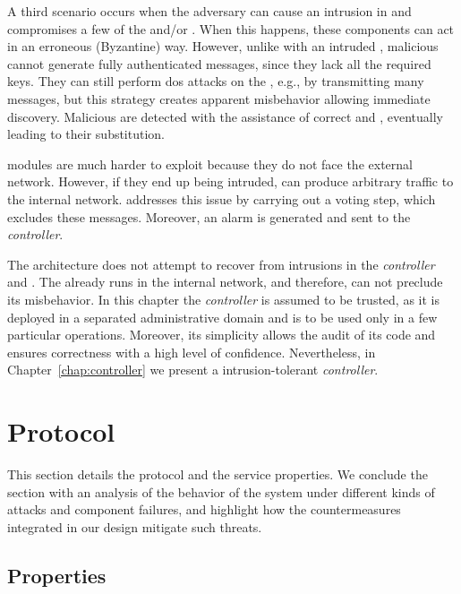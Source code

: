A third scenario occurs when the adversary can cause an intrusion in \sieveq and compromises a few of the \presieves and/or \repsieves. 
When this happens, these components can act in an erroneous (Byzantine) way. 
However, unlike with an intruded \sender, malicious \presieves cannot generate fully authenticated messages, since they lack all the required keys. 
They can still perform \gls{dos} attacks on the \repsieves, e.g., by transmitting many messages, but this strategy creates apparent misbehavior allowing immediate discovery. 
Malicious \presieves are detected with the assistance of correct \sender and \repsieves, eventually leading to their substitution.

\Repsieves modules are much harder to exploit because they do not face the external network. 
However, if they end up being intruded, \repsieves can produce arbitrary traffic to the internal network. 
\Postsieve addresses this issue by carrying out a voting step, which excludes these messages. Moreover, an alarm is generated and sent to the \emph{controller}.

The \sieveq architecture does not attempt to recover from intrusions in the \emph{controller} and \postsieve.
The \postsieve already runs in the internal network, and therefore, \sieveq can not preclude its misbehavior.
In this chapter the \emph{controller} is assumed to be trusted, as it is deployed in a separated administrative domain and is to be used only in a few particular operations.
Moreover, its simplicity allows the audit of its code and ensures correctness with a high level of confidence.
Nevertheless, in Chapter~\ref{chap:controller} we present a intrusion-tolerant \emph{controller}.




\section{\sieveq Protocol}
\label{protocol}


This section details the \sieveq protocol and the service properties. 
We conclude the section with an analysis of the behavior of the system under different kinds of attacks and component failures, and highlight how the countermeasures integrated in our design mitigate such threats.

\subsection{Properties}
\label{properties}

